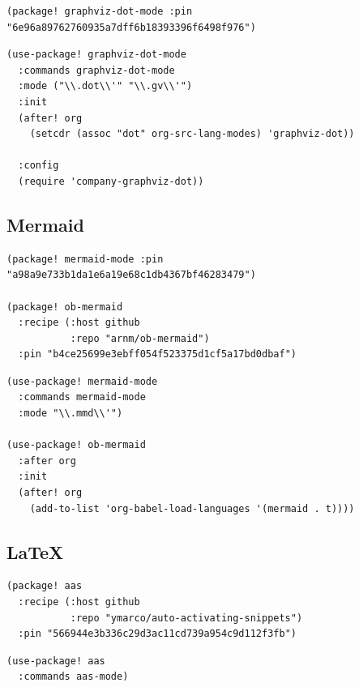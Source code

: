 \documentclass[11pt]{article}
\begin{document}
\begin{verbatim}
(package! graphviz-dot-mode :pin "6e96a89762760935a7dff6b18393396f6498f976")
\end{verbatim}

\begin{verbatim}
(use-package! graphviz-dot-mode
  :commands graphviz-dot-mode
  :mode ("\\.dot\\'" "\\.gv\\'")
  :init
  (after! org
    (setcdr (assoc "dot" org-src-lang-modes) 'graphviz-dot))

  :config
  (require 'company-graphviz-dot))
\end{verbatim}

\subsection{Mermaid}
\label{sec:org70a1342}

\begin{verbatim}
(package! mermaid-mode :pin "a98a9e733b1da1e6a19e68c1db4367bf46283479")

(package! ob-mermaid
  :recipe (:host github
           :repo "arnm/ob-mermaid")
  :pin "b4ce25699e3ebff054f523375d1cf5a17bd0dbaf")
\end{verbatim}

\begin{verbatim}
(use-package! mermaid-mode
  :commands mermaid-mode
  :mode "\\.mmd\\'")

(use-package! ob-mermaid
  :after org
  :init
  (after! org
    (add-to-list 'org-babel-load-languages '(mermaid . t))))
\end{verbatim}

\subsection{\LaTeX{}}
\label{sec:org2cb3bb7}

\begin{verbatim}
(package! aas
  :recipe (:host github
           :repo "ymarco/auto-activating-snippets")
  :pin "566944e3b336c29d3ac11cd739a954c9d112f3fb")
\end{verbatim}

\begin{verbatim}
(use-package! aas
  :commands aas-mode)
\end{verbatim}
\end{document}
